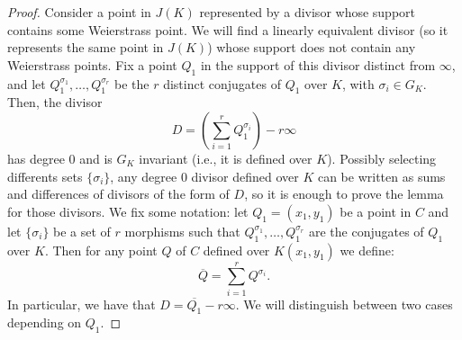 \documentclass[a4paper, 12pt]{amsart}
\theoremstyle{definition}
\theoremstyle{plain}
\theoremstyle{plain}
\theoremstyle{plain}
\theoremstyle{plain}
\theoremstyle{remark}
\theoremstyle{remark}
\theoremstyle{plain}
\begin{document}
	\begin{proof}
		Consider a point in $J(K)$ represented by a divisor whose support contains some Weierstrass point. We will find a linearly equivalent divisor (so it represents the same point in $J(K)$) whose support does not contain any Weierstrass points. Fix a point $Q_1$ in the support of this divisor distinct from $\infty$, and let $Q_1^{\sigma_1},\ldots,Q_1^{\sigma_r}$ be the $r$ distinct conjugates of $Q_1$ over $K$, with $\sigma_i\in G_K$. Then, the divisor
		\begin{equation*}
			D=\left(\sum_{i=1}^r Q_1^{\sigma_i}\right) -r\infty
		\end{equation*}
		has degree 0 and is $G_K$ invariant (i.e., it is defined over $K$). Possibly selecting differents sets $\{\sigma_i\}$, any degree 0 divisor defined over $K$ can be written as sums and differences of divisors of the form of $D$, so it is enough to prove the lemma for those divisors. We fix some notation: let $Q_1=(x_1,y_1)$ be a point in $C$ and let $\{\sigma_i\}$ be a set of $r$ morphisms such that $Q_1^{\sigma_1},\ldots,Q_1^{\sigma_r}$ are the conjugates of $Q_1$ over $K$. Then for any point $Q$ of $C$ defined over $K(x_1,y_1)$ we define:
		\begin{equation*}
			\overline{Q}=\sum_{i=1}^r Q^{\sigma_i}.
		\end{equation*}
		In particular, we have that $D=\overline{Q_1}-r\infty$. We will distinguish between two cases depending on $Q_1$.
		

\end{proof}
\end{document}
